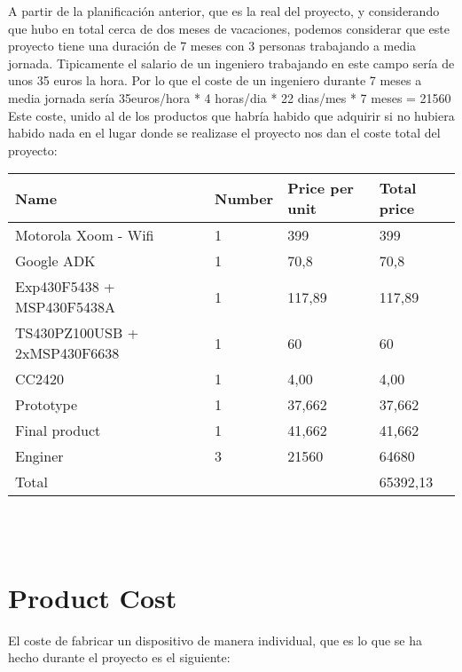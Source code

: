 	A partir de la planificación anterior, que es la real del proyecto, y considerando que hubo en total cerca de dos meses de vacaciones, podemos considerar que este proyecto tiene una duración de 7 meses con 3 personas trabajando a media jornada. Tipicamente el salario de un ingeniero trabajando en este campo sería de unos 35 euros la hora. Por lo que el coste de un ingeniero durante 7 meses a media jornada sería 35euros/hora * 4 horas/dia * 22 dias/mes * 7 meses = 21560\\

	Este coste, unido al de los productos que habría habido que adquirir si no hubiera habido nada en el lugar donde se realizase el proyecto nos dan el coste total del proyecto:\\

\begin{tabular}{| p{5cm} |l | l | l |} 
\hline
   Name & Number& Price per unit & Total price\\ \hline
   Motorola Xoom - Wifi & 1 & 399 & 399\\ \hline
   Google ADK & 1 & 70,8 & 70,8\\ \hline
   Exp430F5438 + MSP430F5438A & 1 & 117,89 & 117,89\\ \hline
   TS430PZ100USB + 2xMSP430F6638 & 1 & 60 & 60\\ \hline
   CC2420 & 1 & 4,00 & 4,00\\ \hline
   Prototype & 1 & 37,662 & 37,662\\ \hline
   Final product & 1 & 41,662 & 41,662\\ \hline
   Enginer & 3 & 21560 & 64680\\ \hline
   Total & & & 65392,13\\ \hline
\hline
\end{tabular}\\\\


\chapter{Product Cost}
\label{ch:cost}

	El coste de fabricar un dispositivo de manera individual, que es lo que se ha hecho durante el proyecto es el siguiente:\\

